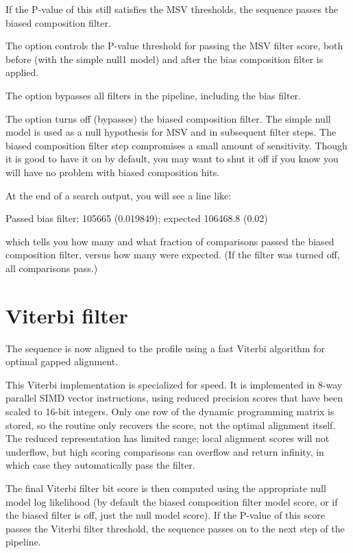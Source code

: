 If the P-value of this still satisfies the MSV thresholds, the
sequence passes the biased composition filter. 

The  option controls the P-value threshold for
passing the MSV filter score, both before (with the simple null1
model) and after the bias composition filter is applied.

The  option bypasses all filters in the pipeline,
including the bias filter.

The  option turns off (bypasses) the biased
composition filter.  The simple null model is used as a null
hypothesis for MSV and in subsequent filter steps. The biased
composition filter step compromises a small amount of sensitivity.
Though it is good to have it on by default, you may want to shut it
off if you know you will have no problem with biased composition hits.

 At the end of a search output, you will see a line like:

\begin{sreoutput}
 Passed bias filter:                   105665  (0.019849); expected 106468.8 (0.02)
\end{sreoutput}

which tells you how many and what fraction of comparisons passed the
biased composition filter, versus how many were expected. (If the
filter was turned off, all comparisons pass.)


\section{Viterbi filter}

The sequence is now aligned to the profile using a fast Viterbi
algorithm for optimal gapped alignment.

This Viterbi implementation is specialized for speed.  It is
implemented in 8-way parallel SIMD vector instructions, using reduced
precision scores that have been scaled to 16-bit integers. Only one
row of the dynamic programming matrix is stored, so the routine only
recovers the score, not the optimal alignment itself. The reduced
representation has limited range; local alignment scores will not
underflow, but high scoring comparisons can overflow and return
infinity, in which case they automatically pass the filter.

The final Viterbi filter bit score is then computed using the
appropriate null model log likelihood (by default the biased
composition filter model score, or if the biased filter is off, just
the null model score). If the P-value of this score passes the Viterbi
filter threshold, the sequence passes on to the next step of the
pipeline.
 
